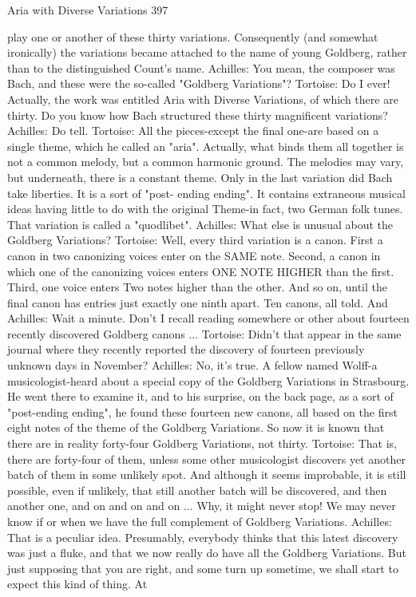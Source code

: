 Aria with Diverse Variations                                                          397

    play one or another of these thirty variations. Consequently (and somewhat
    ironically) the variations became attached to the name of young Goldberg, rather
    than to the distinguished Count's name.
Achilles: You mean, the composer was Bach, and these were the so-called "Goldberg
    Variations"?
Tortoise: Do I ever! Actually, the work was entitled Aria with Diverse Variations, of
    which there are thirty. Do you know how Bach structured these thirty magnificent
    variations?
Achilles: Do tell.
Tortoise: All the pieces-except the final one-are based on a single theme, which he called
    an "aria". Actually, what binds them all together is not a common melody, but a
    common harmonic ground. The melodies may vary, but underneath, there is a
    constant theme. Only in the last variation did Bach take liberties. It is a sort of "post-
    ending ending". It contains extraneous musical ideas having little to do with the
    original Theme-in fact, two German folk tunes. That variation is called a
    "quodlibet".
Achilles: What else is unusual about the Goldberg Variations?
Tortoise: Well, every third variation is a canon. First a canon in two canonizing voices
    enter on the SAME note. Second, a canon in which one of the canonizing voices
    enters ONE NOTE HIGHER than the first. Third, one voice enters Two notes higher
    than the other. And so on, until the final canon has entries just exactly one ninth
    apart. Ten canons, all told. And
Achilles: Wait a minute. Don't I recall reading somewhere or other about fourteen
    recently discovered Goldberg canons ...
Tortoise: Didn't that appear in the same journal where they recently reported the
    discovery of fourteen previously unknown days in November?
Achilles: No, it's true. A fellow named Wolff-a musicologist-heard about a special copy
    of the Goldberg Variations in Strasbourg. He went there to examine it, and to his
    surprise, on the back page, as a sort of "post-ending ending", he found these fourteen
    new canons, all based on the first eight notes of the theme of the Goldberg
    Variations. So now it is known that there are in reality forty-four Goldberg
    Variations, not thirty.
Tortoise: That is, there are forty-four of them, unless some other musicologist discovers
    yet another batch of them in some unlikely spot. And although it seems improbable,
    it is still possible, even if unlikely, that still another batch will be discovered, and
    then another one, and on and on and on ... Why, it might never stop! We may never
    know if or when we have the full complement of Goldberg Variations.
Achilles: That is a peculiar idea. Presumably, everybody thinks that this latest discovery
    was just a fluke, and that we now really do have all the Goldberg Variations. But just
    supposing that you are right, and some turn up sometime, we shall start to expect
    this kind of thing. At




